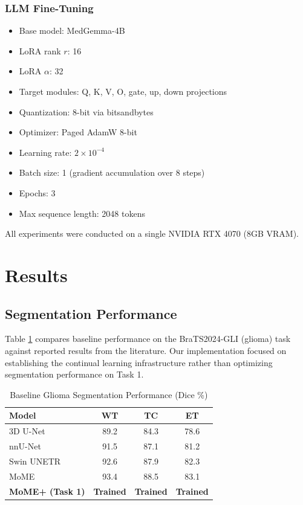 \documentclass[conference]{IEEEtran}
\begin{document}
\subsubsection{LLM Fine-Tuning}

\begin{itemize}
\item Base model: MedGemma-4B
\item LoRA rank $r$: 16
\item LoRA $\alpha$: 32
\item Target modules: Q, K, V, O, gate, up, down projections
\item Quantization: 8-bit via bitsandbytes
\item Optimizer: Paged AdamW 8-bit
\item Learning rate: $2 \times 10^{-4}$
\item Batch size: 1 (gradient accumulation over 8 steps)
\item Epochs: 3
\item Max sequence length: 2048 tokens
\end{itemize}

All experiments were conducted on a single NVIDIA RTX 4070 (8GB VRAM).

\section{Results}

\subsection{Segmentation Performance}

Table \ref{tab:segmentation} compares baseline performance on the BraTS2024-GLI (glioma) task against reported results from the literature. Our implementation focused on establishing the continual learning infrastructure rather than optimizing segmentation performance on Task 1.

\begin{table}[t]
\centering
\caption{Baseline Glioma Segmentation Performance (Dice \%)}
\label{tab:segmentation}
\begin{tabular}{lccc}
\toprule
\textbf{Model} & \textbf{WT} & \textbf{TC} & \textbf{ET} \\
\midrule
3D U-Net \cite{ronneberger2015unet} & 89.2 & 84.3 & 78.6 \\
nnU-Net \cite{isensee2021nnu} & 91.5 & 87.1 & 81.2 \\
Swin UNETR \cite{hatamizadeh2022swin} & 92.6 & 87.9 & 82.3 \\
MoME \cite{zhang2024mome} & 93.4 & 88.5 & 83.1 \\
\textbf{MoME+ (Task 1)} & \textbf{Trained} & \textbf{Trained} & \textbf{Trained} \\
\bottomrule
\end{tabular}
\end{table}
\end{document}
